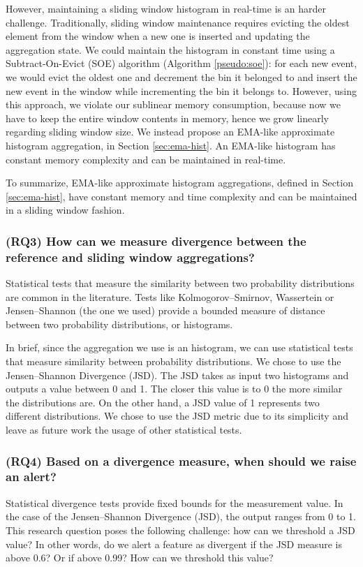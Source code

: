 However, maintaining a sliding window histogram in real-time is an harder challenge. Traditionally, sliding window maintenance requires evicting the oldest element from the window when a new one is inserted and updating the aggregation state. We could maintain the histogram in constant time using a Subtract-On-Evict (SOE) algorithm (Algorithm \ref{pseudo:soe}): for each new event, we would evict the oldest one and decrement the bin it belonged to and insert the new event in the window while incrementing the bin it belongs to. However, using this approach, we violate our sublinear memory consumption, because now we have to keep the entire window contents in memory, hence we grow linearly regarding sliding window size. We instead propose an EMA-like approximate histogram aggregation, in Section \ref{sec:ema-hist}. An EMA-like histogram has constant memory complexity and can be maintained in real-time.

To summarize, EMA-like approximate histogram aggregations, defined in Section \ref{sec:ema-hist}, have constant memory and time complexity and can be maintained in a sliding window fashion.

\subsubsection*{(RQ3) How can we measure divergence between the reference and sliding window aggregations?}
Statistical tests that measure the similarity between two probability distributions are common in the literature. Tests like Kolmogorov–Smirnov, Wassertein or Jensen–Shannon (the one we used) provide a bounded measure of distance between two probability distributions, or histograms. 

In brief, since the aggregation we use is an histogram, we can use statistical tests that measure similarity between probability distributions. We chose to use the Jensen–Shannon Divergence (JSD). The JSD takes as input two histograms and outputs a value between 0 and 1. The closer this value is to 0 the more similar the distributions are. On the other hand, a JSD value of 1 represents two different distributions. We chose to use the JSD metric due to its simplicity and leave as future work the usage of other statistical tests.


\subsubsection*{(RQ4) Based on a divergence measure, when should we raise an alert?}
Statistical divergence tests provide fixed bounds for the measurement value. In the case of the Jensen–Shannon Divergence (JSD), the output ranges from 0 to 1. This research question poses the following challenge: how can we threshold a JSD value? In other words, do we alert a feature as divergent if the JSD measure is above 0.6? Or if above 0.99? How can we threshold this value?

